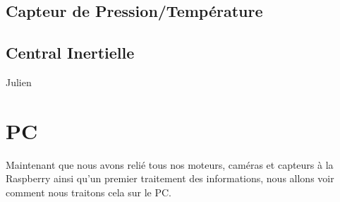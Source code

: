 \documentclass[a4paper,11pt]{report}
\begin{document}
		\subsection{Capteur de Pression/Température}
		
		\subsection{Central Inertielle}
		Julien
		\newpage
	\section{PC}
		Maintenant que nous avons relié tous nos moteurs, caméras et capteurs à la Raspberry ainsi qu'un premier traitement des informations, nous allons voir comment nous traitons cela sur le PC.
		
\end{document}
